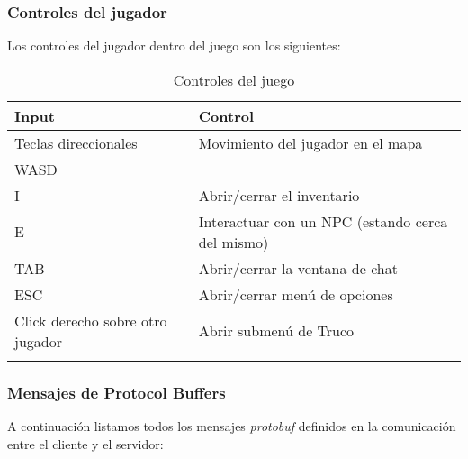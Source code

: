
\subsubsection{Controles del jugador}

\noindent Los controles del jugador dentro del juego son los siguientes:

\begin{longtable}{|l|l|}
    \hline
    \textbf{Input} & \textbf{Control}\\
    \hline
    Teclas direccionales & Movimiento del jugador en el mapa \\
    WASD                 &  \\
    \hline
    I                    & Abrir/cerrar el inventario \\
    \hline
    E                    & Interactuar con un NPC (estando cerca del mismo) \\
    \hline
    TAB                  & Abrir/cerrar la ventana de chat \\
    \hline
    ESC                    & Abrir/cerrar menú de opciones \\
    \hline
    Click derecho sobre otro jugador & Abrir submenú de Truco \\
    \hline
    \caption{Controles del juego}\\
\end{longtable}

\subsubsection{Mensajes de Protocol Buffers}

\noindent A continuación listamos todos los mensajes \textit{protobuf} definidos
en la comunicación entre el cliente y el servidor:

